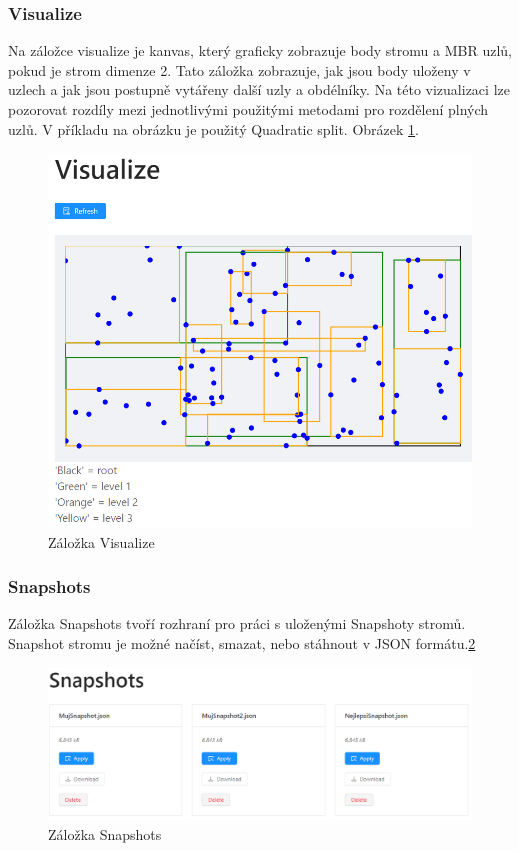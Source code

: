 \documentclass[a4paper,10pt]{article}
\begin{document}
\subsubsection*{Visualize}
Na záložce visualize je kanvas, který graficky zobrazuje body stromu a MBR uzlů, pokud je strom dimenze 2. Tato záložka zobrazuje, jak jsou body uloženy v uzlech a jak jsou postupně vytářeny další uzly a obdélníky. Na této vizualizaci lze pozorovat rozdíly mezi jednotlivými použitými metodami pro rozdělení plných uzlů. V příkladu na obrázku je použitý Quadratic split. Obrázek \ref{fig:visualize}.
\begin{figure}
    \includegraphics[width=\textwidth]{Visualize.png}
    \caption{Záložka Visualize}
    \label{fig:visualize}
\end{figure}

\subsubsection*{Snapshots}
Záložka Snapshots tvoří rozhraní pro práci s uloženými Snapshoty stromů. Snapshot stromu je možné načíst, smazat, nebo stáhnout v JSON formátu.\ref{fig:snapshot}
\begin{figure}
    \includegraphics[width=\textwidth]{Snapshot.png}
    \caption{Záložka Snapshots}
    \label{fig:snapshot}
\end{figure}
\end{document}
